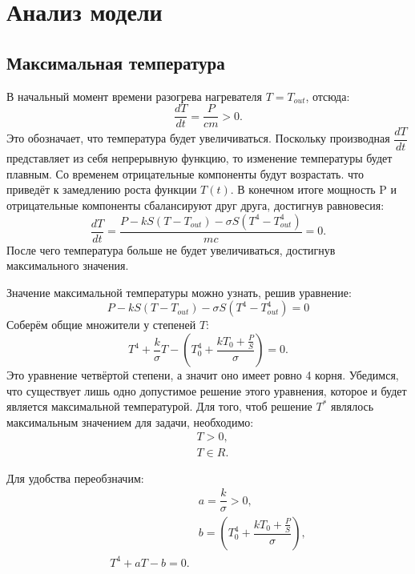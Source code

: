 \pagebreak

\section{Анализ модели}

	\subsection{Максимальная температура}
	В начальный момент времени разогрева нагревателя \( T = T_{out} \), отсюда:
	\[ \dfrac{dT}{dt} = \dfrac{P}{cm} > 0.\]
	Это обозначает, что температура будет увеличиваться. Поскольку производная \( \dfrac{dT}{dt} \) представляет из себя непрерывную функцию, то изменение температуры будет плавным. Со временем отрицательные компоненты будут возрастать. что приведёт к замедлению роста функции \( T(t) \). В конечном итоге мощность P и отрицательные компоненты сбалансируют друг друга, достигнув равновесия:
	\[ \dfrac{d T}{dt} = \dfrac{P - kS \left(T - T_{out} \right) - \sigma S \left(T^4 - T_{out}^4 \right)}{mc} = 0.\]
	После чего температура больше не будет увеличиваться, достигнув максимального значения. 

	Значение максимальной температуры можно узнать, решив уравнение:
	\[ P - kS \left(T - T_{out} \right) - \sigma S \left(T^4 - T_{out}^4 \right) = 0 \]
	Соберём общие множители у степеней \( T \):
	\[ T^4 + \dfrac{k}{\sigma} T - \left(T_0^4 + \dfrac{kT_0 + \frac{P}{S}}{\sigma} \right) = 0.\]
	Это уравнение четвёртой степени, а значит оно имеет ровно 4 корня. Убедимся, что существует лишь одно допустимое решение этого уравнения, которое и будет является максимальной температурой. Для того, чтоб решение \( T^* \) являлось максимальным значением для задачи, необходимо:
	\begin{align}
		&T > 0, \\
		&T \in R. 
	\end{align} \label{conds}

	Для удобства переобзначим:
	\begin{align*}
		&a = \dfrac{k}{\sigma} > 0, \\
		&b = \left(T_0^4 + \dfrac{kT_0 + \frac{P}{S}}{\sigma} \right), \\
		T^4 + aT - b = 0.
	\end{align*}



\pagebreak